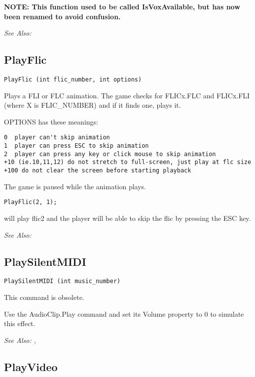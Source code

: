 \bf{NOTE:} This function used to be called IsVoxAvailable, but has now been renamed to avoid confusion.

\it{See Also:} 


\subsection{PlayFlic}\label{PlayFlic}%

\begin{verbatim}
PlayFlic (int flic_number, int options)
\end{verbatim}
Plays a FLI or FLC animation. The game checks for FLICx.FLC and FLICx.FLI
(where X is FLIC_NUMBER) and if it finds one, plays it.

OPTIONS has these meanings:
\begin{verbatim}
0  player can't skip animation
1  player can press ESC to skip animation
2  player can press any key or click mouse to skip animation
+10 (ie.10,11,12) do not stretch to full-screen, just play at flc size
+100 do not clear the screen before starting playback
\end{verbatim}
The game is paused while the animation plays.

\begin{verbatim}
PlayFlic(2, 1);
\end{verbatim}
will play flic2 and the player will be able to skip the flic by pressing the ESC key.

\it{See Also:} 


\subsection{PlaySilentMIDI}\label{PlaySilentMIDI}%

\begin{verbatim}
PlaySilentMIDI (int music_number)
\end{verbatim}
This command is obsolete.

Use the AudioClip.Play command and set its Volume property to 0 to simulate this effect.

\it{See Also:} , 


\subsection{PlayVideo}\label{PlayVideo}%

